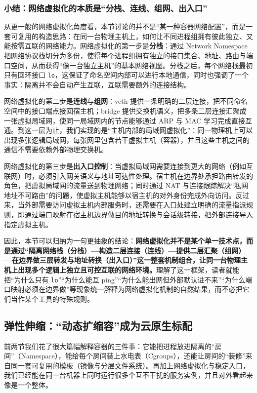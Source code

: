 \subsubsection{小结：网络虚拟化的本质是“分栈、连线、组网、出入口”}

从更一般的网络虚拟化角度看，本节讨论的并不是“某一种容器网络配置”，而是一套可复用的构造思路：在同一台物理主机上，如何让不同进程组拥有彼此独立、又能按需互联的网络能力。网络虚拟化的第一步是\textbf{分栈}：通过 Network Namespace 把网络协议栈切分为多份，使得每个进程组拥有独立的接口集合、地址、路由与端口空间，从而获得“像一台独立主机”的基本网络视图。分栈之后，每个网络栈最初只有回环接口 \texttt{lo}，这保证了命名空间内部可以进行本地通信，同时也强调了一个事实：隔离并不会自动产生互联，互联需要额外的连接结构。

网络虚拟化的第二步是\textbf{连线}与\textbf{组网}：veth 提供一条明确的二层连接，把不同命名空间中的接口端点接回宿主机；bridge 提供交换机语义，把多条二层连接汇聚成一张虚拟局域网，使同一局域网内的节点能够通过 ARP 与 MAC 学习完成直接互通。到这一层为止，我们实现的是“主机内部的局域网虚拟化”：同一物理机上可以出现多张逻辑局域网，每张网里包含若干虚拟主机（容器），并且这些主机之间的通信不需要依赖外部物理交换机。

网络虚拟化的第三步是\textbf{出入口控制}：当虚拟局域网需要连接到更大的网络（例如互联网）时，必须引入网关语义与地址可达性处理。宿主机在边界处承担路由转发的角色，把虚拟局域网的流量送到物理网络；同时通过 NAT 与连接跟踪解决“私网地址不可路由”的问题，使虚拟主机能够以宿主机的对外身份完成外向访问。反过来，当外部需要访问虚拟主机内部服务时，还需要在入口处建立明确的流量指派规则，即通过端口映射在宿主机边界做目的地址转换与会话级转接，把外部连接导入指定虚拟主机。

因此，本节可以归纳为一句更抽象的结论：\textbf{网络虚拟化并不是某个单一技术点，而是通过“隔离网络栈（分栈）—构造二层连接（连线）—提供二层汇聚（组网）—在边界做三层转发与地址转换（出入口）”这一整套机制组合，让同一台物理主机上出现多个逻辑上独立且可控互联的网络环境。}理解了这一框架，读者就能把“为什么只有 \texttt{lo}”“为什么能互 ping”“为什么能出网但外部默认进不来”“为什么端口映射必须在边界做”等现象统一解释为网络虚拟化机制的自然结果，而不必把它们当作某个工具的特殊规则。


\subsection{弹性伸缩：“动态扩缩容”成为云原生标配}

前两节我们花了很大篇幅解释容器的三件事：它能把进程放进隔离的“房间”（Namespace），能给每个房间装上水电表（Cgroups），还能让房间的“装修”来自同一套可复用的模板（镜像与分层文件系统）。再加上网络虚拟化与稳定入口，我们已经能在同一台机器上同时运行很多个互不干扰的服务实例，并且对外看起来像是一个整体。

